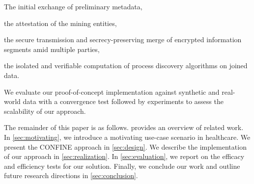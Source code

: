 %
\begin{inparaenum}
	\item The initial exchange of preliminary metadata,
	\item the attestation of the mining entities,
	\item the secure transmission and secrecy-preserving merge of encrypted information segments amid multiple parties,
	\item the isolated and verifiable computation of process discovery algorithms on joined data.
\end{inparaenum}
%
We evaluate our proof-of-concept implementation against synthetic and real-world data with a convergence test followed by experiments to assess the scalability of our approach.




The remainder of this paper is as follows.  provides an overview of related work. %
In \cref{sec:motivating}, we introduce a motivating use-case scenario in healthcare. We present the CONFINE approach in \cref{sec:design}. We describe the implementation of our approach in \cref{sec:realization}. %
In \cref{sec:evaluation}, we report on the efficacy and efficiency tests for our solution.
Finally, we conclude our work and outline future research directions in \cref{sec:conclusion}.
